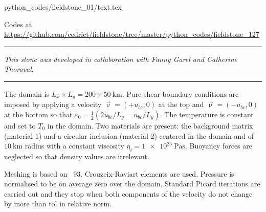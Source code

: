 \begin{flushright} {\tiny {\color{gray} python\_codes/fieldstone\_01/text.tex}} \end{flushright}



\begin{center}

Codes at \url{https://github.com/cedrict/fieldstone/tree/master/python_codes/fieldstone_127}
\end{center}

\par\noindent\rule{\textwidth}{0.4pt}

{\sl This stone was developed in collaboration with Fanny Garel and Catherine Thoraval}. 

\par\noindent\rule{\textwidth}{0.4pt}


The domain is $L_x \times L_y=200\times 50~\si{\km}$. Pure shear boundary conditions are imposed by 
applying a velocity $\vec\upnu=(+u_{bc},0)$ at the top and $\vec\upnu=(-u_{bc},0)$ at the bottom so 
that $\dot\varepsilon_{0}=\frac12 (2u_{bc}/L_y=u_{bc}/L_y)$.
The temperature is constant and set to $T_0$ in the domain.
Two materials are present: the background matrix (material 1) and a circular inclusion (material 2)
centered in the domain and of $10~\si{\km}$ radius with a constant 
viscosity $\eta_i=\SI{1e25}{\pascal\second}$.
Buoyancy forces are neglected so that density values are irrelevant.

Meshing is based on \stone~93. Crouzeix-Raviart elements are used. Pressure is normalised to be
on average zero over the domain.
Standard Picard iterations are carried out and they stop when both components 
of the velocity do not change by more than {\python tol} in relative norm. 


